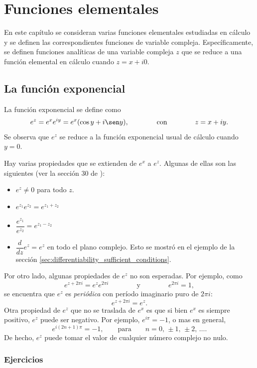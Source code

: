 \documentclass[a4paper]{report}
\begin{document}
\chapter{Funciones elementales}

En este capítulo se consideran varias funciones elementales estudiadas en cálculo y se definen las  correspondientes funciones de variable compleja. Específicamente, se definen funciones analíticas de una variable compleja \(z\) que se reduce a una función elemental en cálculo cuando \(z=x+i0\).

\section{La función exponencial}\label{sec:exponential_function}

La función exponencial se define como
\[
 e^z=e^xe^{iy}=e^x(\cos y+i\sen y),\qquad\qquad\textrm{con}\qquad\qquad z=x+iy.
\]
Se observa que \(e^z\) se reduce a la función exponencial usual de cálculo cuando \(y=0\).

Hay varias propiedades que se extienden de \(e^x\) a \(e^z\). Algunas de ellas son las siguientes (ver la sección 30 de \cite{brown2013complex}):
\begin{itemize}
 \item \(e^z\neq0\) para todo \(z\).
 \item \(e^{z_1}e^{z_2}=e^{z_1+z_2}\)
 \item \(\dfrac{e^{z_1}}{e^{z_2}}=e^{z_1-z_2}\)
 \item \(\dfrac{d}{dz}e^z=e^z\) en todo el plano complejo. Esto se mostró en el ejemplo de la sección \ref{sec:differentiability_sufficient_conditions}.
\end{itemize}

Por otro lado, algunas propiedades de \(e^z\) no son esperadas. Por ejemplo, como
\[
 e^{z+2\pi i}=e^{z}e^{2\pi i}
  \qquad\qquad\textrm{y}\qquad\qquad
 e^{2\pi i}=1, 
\]
se encuentra que \(e^z\) es \emph{periódica} con período imaginario puro de \(2\pi i\):
\[
 e^{z+2\pi i}=e^{z}.
\]
Otra propiedad de \(e^z\) que no se traslada de \(e^x\) es que si bien \(e^x\) es siempre positivo, \(e^z\) puede ser negativo. Por ejemplo, \(e^{i\pi}=-1\), o mas en general,
\[
 e^{i(2n+1)\pi}=-1,\qquad\textrm{para}\qquad n=0,\,\pm1,\,\pm2,\,\dots.
\]
De hecho, \(e^z\) puede tomar el valor de cualquier número complejo no nulo.

\subsection*{Ejercicios}
\end{document}
